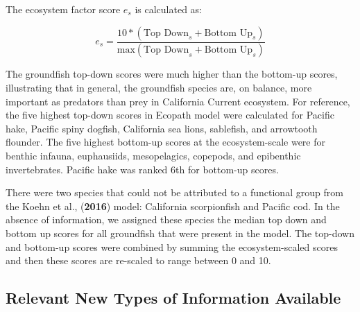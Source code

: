 \documentclass[11pt,
  english,
  a4paper,
]{article}
\begin{document}
\leavevmode\tagmcend\tagstructend\par


The ecosystem factor score {\(e_s\)\leavevmode\tagmcend\tagstructend} is calculated as:

\leavevmode\tagmcend\tagstructend\par


{\[
e_s = \frac{10*(\text{Top Down}_s + \text{Bottom Up}_s)}{\text{max}(\text{Top Down}_s + \text{Bottom Up}_s)}
\]\leavevmode\tagmcend\tagstructend}

\leavevmode\tagmcend\tagstructend\par


The groundfish top-down scores were much higher than the bottom-up scores, illustrating that in general, the groundfish species are, on balance, more important as predators than prey in California Current ecosystem. For reference, the five highest top-down scores in Ecopath model were calculated for Pacific hake, Pacific spiny dogfish, California sea lions, sablefish, and arrowtooth flounder. The five highest bottom-up scores at the ecosystem-scale were for benthic infauna, euphausiids, mesopelagics, copepods, and epibenthic invertebrates. Pacific hake was ranked 6th for bottom-up scores.

\leavevmode\tagmcend\tagstructend\par


There were two species that could not be attributed to a functional group from the Koehn et al., (\textbf{2016}) model: California scorpionfish and Pacific cod. In the absence of information, we assigned these species the median top down and bottom up scores for all groundfish that were present in the model. The top-down and bottom-up scores were combined by summing the ecosystem-scaled scores and then these scores are re-scaled to range between 0 and 10.

\leavevmode\tagmcend\tagstructend\par


\hypertarget{relevant-new-types-of-information-available}{%
\subsection{Relevant New Types of Information Available}\label{relevant-new-types-of-information-available}}
\end{document}

